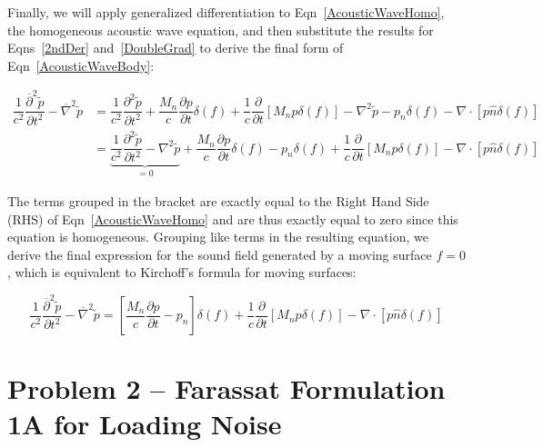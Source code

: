 \documentclass[]{aiaa-tc}%
\begin{document}
Finally, we will apply generalized differentiation to Eqn~\ref{AcousticWaveHomo}, the homogeneous acoustic wave equation, and then substitute the results for Eqns~\ref{2ndDer} and~\ref{DoubleGrad} to derive the final form of Eqn~\ref{AcousticWaveBody}:

\begin{align*}
\dfrac{1}{c^2}\dfrac{\overline{\partial}^2 \widetilde{p}}{\partial t^2}
    - \overline{\nabla}^2 \widetilde{p}
&= \dfrac{1}{c^2} \dfrac{\partial^2\widetilde{p}}{\partial t^2}
    + \dfrac{M_n}{c} \dfrac{\partial p}{\partial t}  \delta(f)
    + \dfrac{1}{c}\dfrac{\partial}{\partial t} \left[ M_n p\delta(f) \right]
    -\nabla^2\widetilde{p} - p_n \delta(f)
    - \nabla\cdot \left[ p\hat{n} \delta(f) \right] \\
&= \underbrace{\dfrac{1}{c^2} \dfrac{\partial^2\widetilde{p}}{\partial t^2}
    -\nabla^2\widetilde{p}}_{=0}
    + \dfrac{M_n}{c} \dfrac{\partial p}{\partial t}  \delta(f)
    - p_n \delta(f)
    + \dfrac{1}{c}\dfrac{\partial}{\partial t} \left[ M_n p\delta(f) \right]
    - \nabla\cdot \left[ p\hat{n} \delta(f) \right]
\end{align*}

The terms grouped in the bracket are exactly equal to the Right Hand Side (RHS) of Eqn~\ref{AcousticWaveHomo} and are thus exactly equal to zero since this equation is homogeneous.  Grouping like terms in the resulting equation, we derive the final expression for the sound field generated by a moving surface $f=0$, which is equivalent to Kirchoff's formula for moving surfaces:

\begin{equation}
\dfrac{1}{c^2}\dfrac{\overline{\partial}^2 \widetilde{p}}{\partial t^2}
    - \overline{\nabla}^2 \widetilde{p}
= \left[ \dfrac{M_n}{c} \dfrac{\partial p}{\partial t} - p_n  \right] \delta(f)
    + \dfrac{1}{c}\dfrac{\partial}{\partial t} \left[ M_n p\delta(f) \right]
    - \nabla\cdot \left[ p\hat{n} \delta(f) \right]
\end{equation}









\section{Problem 2 -- Farassat Formulation 1A for Loading Noise} \label{SecFarassat}
\end{document}
